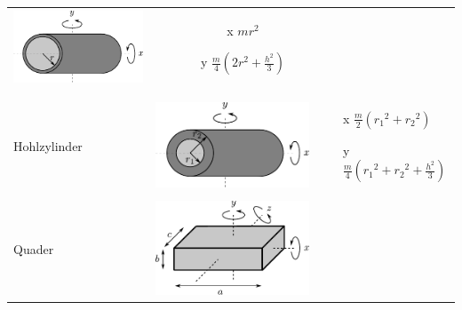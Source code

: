 \begin{table}[h!]
\begin{tabular}{m{2cm} c m{}}
\begin{minipage}{0.3\textwidth}
	\centering
	\includegraphics[scale=\traegscale]{traeg-hohlzylinder-duenn.pdf}
	\end{minipage} &
		\begin{itemize}
		\item[x] $mr^2$
		\item[y] $\frac{m}{4} (2r^2 + \frac{h^2}{3})$
		\end{itemize} \\
& & \\
Hohlzylinder &
	\begin{minipage}{0.3\textwidth}
	\centering
	\includegraphics[scale=\traegscale]{traeg-hohlzylinder.pdf}
	\end{minipage} &
		\begin{itemize}
		\item[x] $\frac{m}{2} \left({r_1}^2 + {r_2}^2 \right)$
		\item[y] $\frac{m}{4} \left({r_1}^2 + {r_2}^2 
			+ \frac{h^2}{3} \right)$
		\end{itemize}\\
Quader &
	\begin{minipage}{0.3\textwidth}
	\centering
	\includegraphics[scale=\traegscale]{traeg-quader.pdf}

\end{minipage}
\end{tabular}
\end{table}
